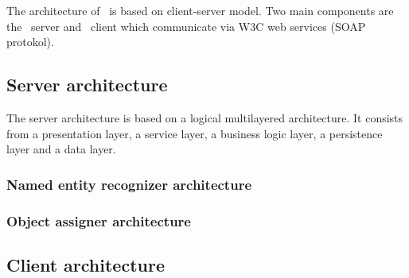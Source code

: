 

The architecture of \textan\ is based on client-server model. Two main components
are the \textan\ server and \textan\ client which communicate via W3C web services
(SOAP protokol).

\subsection{Server architecture}

The server architecture is based on a logical multilayered architecture. It
consists from a presentation layer, a service layer, a business logic layer, 
a persistence layer and a data layer.




\subsubsection{Named entity recognizer architecture}


\subsubsection{Object assigner architecture} %


\subsection{Client architecture}

